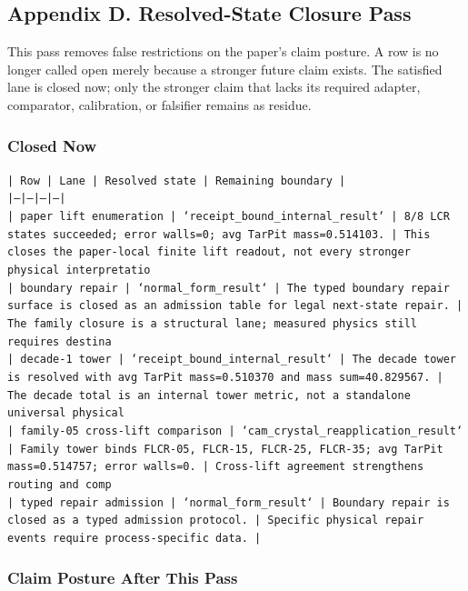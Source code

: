 \documentclass[11pt]{article}
\begin{document}
\subsection*{Appendix D. Resolved-State Closure Pass}

This pass removes false restrictions on the paper's claim posture. A row is no longer called open merely because a stronger future claim exists. The satisfied lane is closed now; only the stronger claim that lacks its required adapter, comparator, calibration, or falsifier remains as residue.

\subsubsection*{Closed Now}

\noindent\texttt{| Row | Lane | Resolved state | Remaining boundary |}\\
\noindent\texttt{|---|---|---|---|}\\
\noindent\texttt{| paper lift enumeration | `receipt\_bound\_internal\_result` | 8/8 LCR states succeeded; error walls=0; avg TarPit mass=0.514103. | This closes the paper-local finite lift readout, not every stronger physical interpretatio}\\
\noindent\texttt{| boundary repair | `normal\_form\_result` | The typed boundary repair surface is closed as an admission table for legal next-state repair. | The family closure is a structural lane; measured physics still requires destina}\\
\noindent\texttt{| decade-1 tower | `receipt\_bound\_internal\_result` | The decade tower is resolved with avg TarPit mass=0.510370 and mass sum=40.829567. | The decade total is an internal tower metric, not a standalone universal physical }\\
\noindent\texttt{| family-05 cross-lift comparison | `cam\_crystal\_reapplication\_result` | Family tower binds FLCR-05, FLCR-15, FLCR-25, FLCR-35; avg TarPit mass=0.514757; error walls=0. | Cross-lift agreement strengthens routing and comp}\\
\noindent\texttt{| typed repair admission | `normal\_form\_result` | Boundary repair is closed as a typed admission protocol. | Specific physical repair events require process-specific data. |}\\

\subsubsection*{Claim Posture After This Pass}
\end{document}
